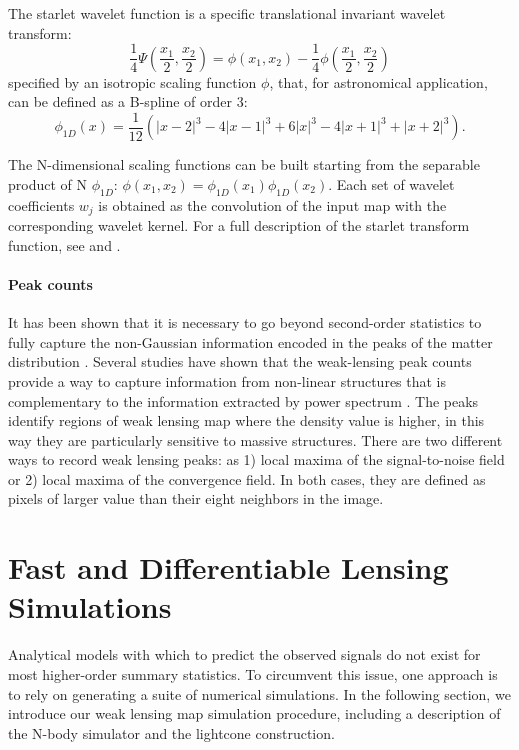 \documentclass[twocolumn,twocolappendix]{aastex63}
\begin{document}
The starlet wavelet function is a specific translational invariant wavelet transform:
\begin{equation}
   \frac{1}{4} \Psi \left ( \frac{x_1}{2}, \frac{x_2}{2} \right )=
    \phi (x_1,x_2)- \frac{1}{4} \phi  \left ( \frac{x_1}{2},  \frac{x_2}{2} \right )
\end{equation}
specified by an isotropic scaling function $\phi$, that,  for astronomical application, can be defined as a B-spline of order 3:
\begin{equation}
\phi_{1D}(x)= \frac{1}{12} (|x-2|^3-4|x-1|^3+6|x|^3-4|x+1|^3+|x+2|^3 ).
\end{equation}

The N-dimensional scaling functions can be built starting from the separable product of N $\phi_{1D}$: $\phi(x_1,x_2)=\phi_{1D}(x_1)\phi_{1D}(x_2)$. 
Each set of wavelet coefficients $w_j$ is obtained as the convolution of the input map with the corresponding wavelet kernel. For a full description of the starlet transform function, see \citet{4060954} and \citet{10.5555/1830428}.

\paragraph{Peak counts}It has been shown that it is necessary to go beyond second-order statistics to fully capture the non-Gaussian information encoded in the peaks of the matter distribution 
\citep{1997A&A...322....1B, 1997ApJ...484..560J,1999A&A...342...15V,2003A&A...397..809S}. Several studies have shown that the weak-lensing peak counts provide a way to capture information from non-linear structures that is complementary to the information extracted by power spectrum \citep{lin2015new, peel2017cosmological, ajani2020constraining, harnois2021cosmic, zurcher2022dark}.
The peaks identify regions of weak lensing map where the density value is higher, in this way they are particularly sensitive to massive structures.
There are two different ways to record weak lensing peaks: as 1) local maxima of the signal-to-noise field or 2) local maxima of the convergence field. In both cases, they are defined as pixels of larger value than their eight neighbors in the image.


\section{Fast and Differentiable Lensing Simulations}\label{Fast_and_Differentiable_Lensing_Simulations}
Analytical models with which to predict the observed signals do not exist for most higher-order summary statistics. 
To circumvent this issue, one approach is to rely on generating a suite of numerical simulations.
In the following section, we introduce our weak lensing map simulation procedure, including a description of the N-body simulator and the lightcone construction.
\end{document}
